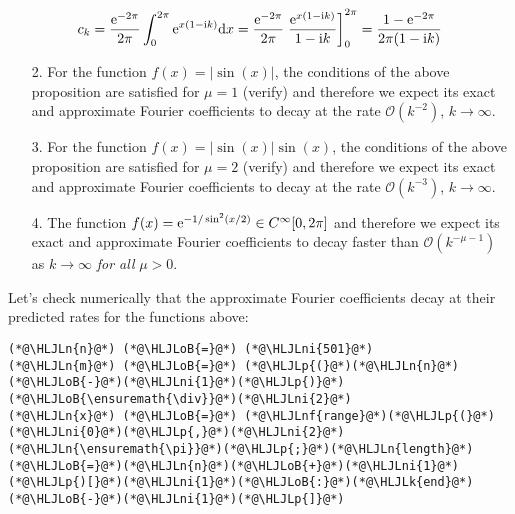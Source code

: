 \documentclass[12pt,landscape]{article}
\newcommand{\HLJLk}[1]{\textcolor[RGB]{148,91,176}{\textbf{#1}}}
\newcommand{\HLJLn}[1]{#1}
\newcommand{\HLJLnf}[1]{\textcolor[RGB]{66,102,213}{#1}}
\newcommand{\HLJLni}[1]{\textcolor[RGB]{59,151,46}{#1}}
\newcommand{\HLJLoB}[1]{\textcolor[RGB]{102,102,102}{\textbf{#1}}}
\newcommand{\HLJLp}[1]{#1}
\begin{document}
{\begin{itemize}
\end{itemize}
\[
c_{k} = \frac{{\rm e}^{-2\pi}}{2\pi}\int_{0}^{2\pi} {\rm e}^{x(1-{\rm i}k)}{\rm d}x = \frac{{\rm e}^{-2\pi}}{2\pi } \left. \frac{{\rm e}^{x(1-{\rm i}k)}}{1-{\rm i}k}   \right]_{0}^{2\pi} = \frac{1 - {\rm e}^{-2\pi}}{2\pi(1-{\rm i}k)}
\]
\begin{itemize}
\item[2. ] For the function $f(x) = \vert \sin(x) \vert$, the conditions of the above proposition are satisfied for $\mu = 1$ (verify) and therefore we expect its exact and approximate Fourier coefficients to decay at the rate $\mathcal{O}(k^{-2})$, $k \to \infty$.


\item[3. ] For the function $f(x) = \vert \sin(x) \vert \sin(x)$, the conditions of the above proposition are satisfied for $\mu = 2$ (verify) and therefore we expect its exact and approximate Fourier coefficients to decay at the rate $\mathcal{O}(k^{-3})$, $k \to \infty$.


\item[4. ] The function $f(x) = {\rm e}^{-1/\sin^2(x/2)} \in C^{\infty}[0, 2\pi]$  and therefore we expect its exact and approximate Fourier coefficients to decay faster than $\mathcal{O}(k^{-\mu-1})$ as $k \to \infty$ \emph{for all} $\mu > 0$.

\end{itemize}
Let's check numerically that the approximate Fourier coefficients decay at their predicted rates for the functions above:


\begin{lstlisting}
(*@\HLJLn{n}@*) (*@\HLJLoB{=}@*) (*@\HLJLni{501}@*)
(*@\HLJLn{m}@*) (*@\HLJLoB{=}@*) (*@\HLJLp{(}@*)(*@\HLJLn{n}@*)(*@\HLJLoB{-}@*)(*@\HLJLni{1}@*)(*@\HLJLp{)}@*)(*@\HLJLoB{\ensuremath{\div}}@*)(*@\HLJLni{2}@*)
(*@\HLJLn{x}@*) (*@\HLJLoB{=}@*) (*@\HLJLnf{range}@*)(*@\HLJLp{(}@*)(*@\HLJLni{0}@*)(*@\HLJLp{,}@*)(*@\HLJLni{2}@*)(*@\HLJLn{\ensuremath{\pi}}@*)(*@\HLJLp{;}@*)(*@\HLJLn{length}@*)(*@\HLJLoB{=}@*)(*@\HLJLn{n}@*)(*@\HLJLoB{+}@*)(*@\HLJLni{1}@*)(*@\HLJLp{)[}@*)(*@\HLJLni{1}@*)(*@\HLJLoB{:}@*)(*@\HLJLk{end}@*)(*@\HLJLoB{-}@*)(*@\HLJLni{1}@*)(*@\HLJLp{]}@*)


\end{lstlisting}}
\end{document}

